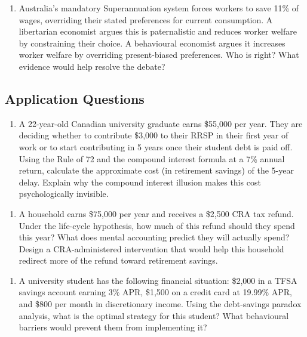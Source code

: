 \documentclass[12pt, letterpaper]{article}
\begin{document}
\begin{enumerate}
\item Australia's mandatory Superannuation system forces workers to save 11\% of wages, overriding their stated preferences for current consumption. A libertarian economist argues this is paternalistic and reduces worker welfare by constraining their choice. A behavioural economist argues it increases worker welfare by overriding present-biased preferences. Who is right? What evidence would help resolve the debate?
\end{enumerate}


\subsection{Application Questions}


\begin{enumerate}
\item A 22-year-old Canadian university graduate earns \$55,000 per year. They are deciding whether to contribute \$3,000 to their RRSP in their first year of work or to start contributing in 5 years once their student debt is paid off. Using the Rule of 72 and the compound interest formula at a 7\% annual return, calculate the approximate cost (in retirement savings) of the 5-year delay. Explain why the compound interest illusion makes this cost psychologically invisible.
\end{enumerate}

\begin{enumerate}
\item A household earns \$75,000 per year and receives a \$2,500 CRA tax refund. Under the life-cycle hypothesis, how much of this refund should they spend this year? What does mental accounting predict they will actually spend? Design a CRA-administered intervention that would help this household redirect more of the refund toward retirement savings.
\end{enumerate}

\begin{enumerate}
\item A university student has the following financial situation: \$2,000 in a TFSA savings account earning 3\% APR, \$1,500 on a credit card at 19.99\% APR, and \$800 per month in discretionary income. Using the debt-savings paradox analysis, what is the optimal strategy for this student? What behavioural barriers would prevent them from implementing it?
\end{enumerate}
\end{document}
